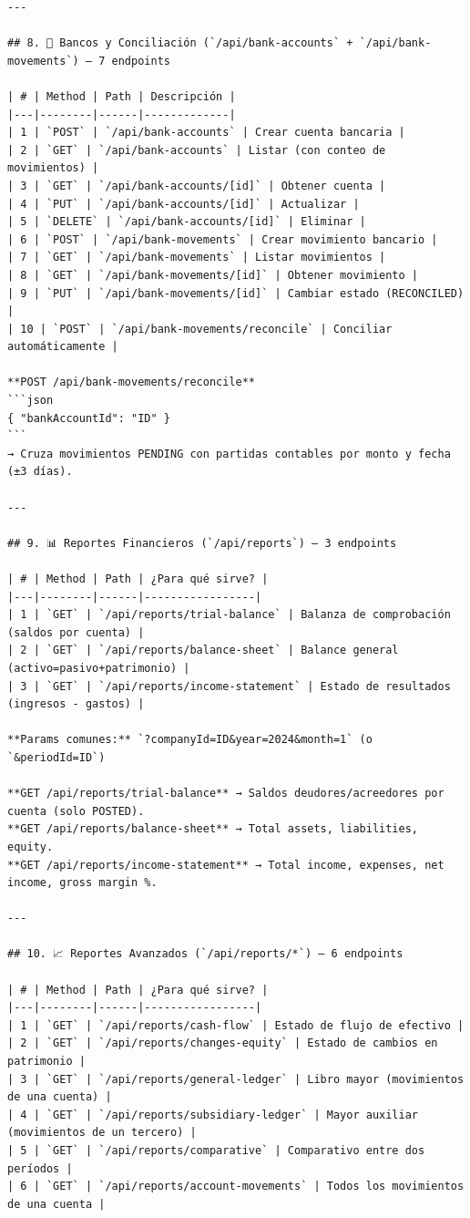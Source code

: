 \documentclass[12pt, a4paper, oneside]{book}
\begin{document}
\begin{lstlisting}
---

## 8. 🏦 Bancos y Conciliación (`/api/bank-accounts` + `/api/bank-movements`) — 7 endpoints

| # | Method | Path | Descripción |
|---|--------|------|-------------|
| 1 | `POST` | `/api/bank-accounts` | Crear cuenta bancaria |
| 2 | `GET` | `/api/bank-accounts` | Listar (con conteo de movimientos) |
| 3 | `GET` | `/api/bank-accounts/[id]` | Obtener cuenta |
| 4 | `PUT` | `/api/bank-accounts/[id]` | Actualizar |
| 5 | `DELETE` | `/api/bank-accounts/[id]` | Eliminar |
| 6 | `POST` | `/api/bank-movements` | Crear movimiento bancario |
| 7 | `GET` | `/api/bank-movements` | Listar movimientos |
| 8 | `GET` | `/api/bank-movements/[id]` | Obtener movimiento |
| 9 | `PUT` | `/api/bank-movements/[id]` | Cambiar estado (RECONCILED) |
| 10 | `POST` | `/api/bank-movements/reconcile` | Conciliar automáticamente |

**POST /api/bank-movements/reconcile**
```json
{ "bankAccountId": "ID" }
```
→ Cruza movimientos PENDING con partidas contables por monto y fecha (±3 días).

---

## 9. 📊 Reportes Financieros (`/api/reports`) — 3 endpoints

| # | Method | Path | ¿Para qué sirve? |
|---|--------|------|-----------------|
| 1 | `GET` | `/api/reports/trial-balance` | Balanza de comprobación (saldos por cuenta) |
| 2 | `GET` | `/api/reports/balance-sheet` | Balance general (activo=pasivo+patrimonio) |
| 3 | `GET` | `/api/reports/income-statement` | Estado de resultados (ingresos - gastos) |

**Params comunes:** `?companyId=ID&year=2024&month=1` (o `&periodId=ID`)

**GET /api/reports/trial-balance** → Saldos deudores/acreedores por cuenta (solo POSTED).  
**GET /api/reports/balance-sheet** → Total assets, liabilities, equity.  
**GET /api/reports/income-statement** → Total income, expenses, net income, gross margin %.

---

## 10. 📈 Reportes Avanzados (`/api/reports/*`) — 6 endpoints

| # | Method | Path | ¿Para qué sirve? |
|---|--------|------|-----------------|
| 1 | `GET` | `/api/reports/cash-flow` | Estado de flujo de efectivo |
| 2 | `GET` | `/api/reports/changes-equity` | Estado de cambios en patrimonio |
| 3 | `GET` | `/api/reports/general-ledger` | Libro mayor (movimientos de una cuenta) |
| 4 | `GET` | `/api/reports/subsidiary-ledger` | Mayor auxiliar (movimientos de un tercero) |
| 5 | `GET` | `/api/reports/comparative` | Comparativo entre dos períodos |
| 6 | `GET` | `/api/reports/account-movements` | Todos los movimientos de una cuenta |


\end{lstlisting}
\end{document}
